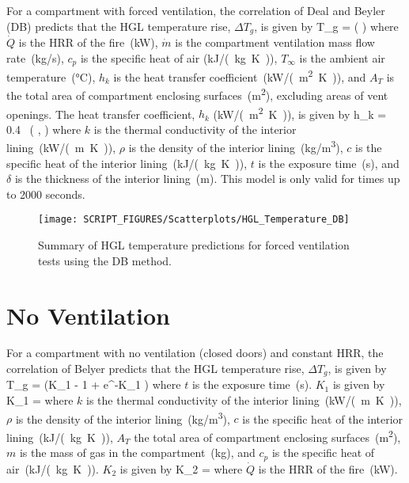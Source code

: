 For a compartment with forced ventilation, the correlation of Deal and Beyler (DB) predicts that the HGL temperature rise, $\Delta T_g$, is given by
\be
\Delta T_g = \left(  \right)
\label{eq:DB}
\ee
where $\dot Q$ is the HRR of the fire~(\si{kW}), $\dot m$ is the compartment ventilation mass flow rate~(\si{kg/s}), $c_p$ is the specific heat of air (\si{kJ/(kg.K)}), $T_\infty$ is the ambient air temperature~(\si{\celsius}), $h_k$ is the heat transfer coefficient~(\si{kW/(m^2.K)}), and $A_T$ is the total area of compartment enclosing surfaces~(\si{m^2}), excluding areas of vent openings. The heat transfer coefficient, $h_k$ (\si{kW/(m^2.K)}), is given by 
\be
h_k = 0.4\  \left(  ,  \right)
\label{eq:DB_hk}
\ee
where $k$ is the thermal conductivity of the interior lining~(\si{kW/(m.K)}), $\rho$ is the density of the interior lining~(\si{kg/m^3}), $c$ is the specific heat of the interior lining~(\si{kJ/(kg.K)}), $t$ is the exposure time~(\si{\second}), and $\delta$ is the thickness of the interior lining~(\si{m}). This model is only valid for times up to 2000 seconds.

\begin{figure}[ht]
\begin{center}
\texttt{[image: SCRIPT\_FIGURES/Scatterplots/HGL\_Temperature\_DB]}
\end{center}
\caption[Summary of HGL temperature predictions for forced ventilation tests (DB)]
{Summary of HGL temperature predictions for forced ventilation tests using the DB method.}
\label{HGL_Summary_Forced_Ventilation_DB}
\end{figure}


\clearpage


\section{No Ventilation}

For a compartment with no ventilation (closed doors) and constant HRR, the correlation of Belyer predicts that the HGL temperature rise, $\Delta T_g$, is given by
\be
\Delta T_g =  (K_1  - 1 + e^{-K_1 })
\label{eq:Beyler}
\ee
where $t$ is the exposure time~(\si{\second}). $K_1$ is given by
\be
K_1 = 
\label{eq:Beyler_K1}
\ee
where $k$ is the thermal conductivity of the interior lining~(\si{kW/(m.K)}), $\rho$ is the density of the interior lining~(\si{kg/m^3}), $c$ is the specific heat of the interior lining~(\si{kJ/(kg.K)}), $A_T$ the total area of compartment enclosing surfaces~(\si{m^2}), $m$ is the mass of gas in the compartment~(\si{kg}), and $c_p$ is the specific heat of air~(\si{kJ/(kg.K)}). $K_2$ is given by
\be
K_2 = 
\label{eq:Beyler_K2}
\ee
where $\dot Q$ is the HRR of the fire~(\si{kW}).

